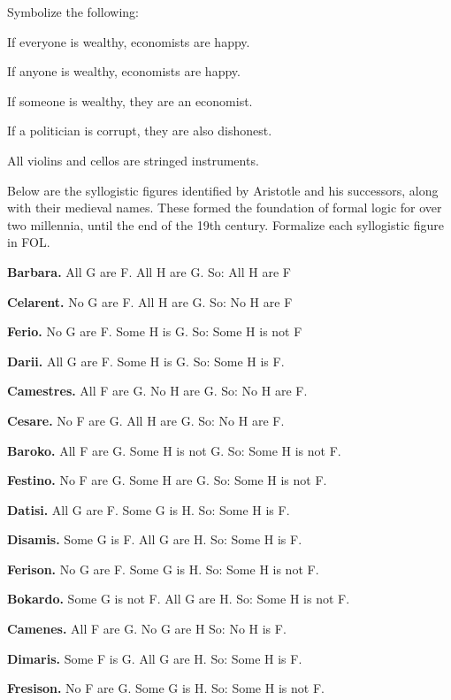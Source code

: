 \practiceproblems
\problempart  Symbolize the following:

\begin{earg}
\item If everyone is wealthy, economists are happy.
\item If anyone is wealthy, economists are happy.
\item If someone is wealthy, they are an economist.
\item If a politician is corrupt, they are also dishonest.
\item All violins and cellos are stringed instruments.  %
\end{earg}

\problempart\label{pr.BarbaraEtc}
Below are the syllogistic figures identified by Aristotle and his successors, along with their medieval names.  These formed the foundation of formal logic for over two millennia, until the end of the 19th century.  Formalize each syllogistic figure in FOL.

\begin{ebullet}
	\item \textbf{Barbara.} All G are F. All H are G. So:  All H are F
	\item \textbf{Celarent.} No G are F. All H are G. So: No H are F
	\item \textbf{Ferio.} No G are F. Some H is G. So: Some H is not F
	\item \textbf{Darii.} All G are F. Some H is G. So: Some H is F.
	\item \textbf{Camestres.} All F are G. No H are G. So: No H are F.
	\item \textbf{Cesare.} No F are G. All H are G. So: No H are F.
	\item \textbf{Baroko.} All F are G. Some H is not G. So: Some H is not F.
	\item \textbf{Festino.} No F are G. Some H are G. So: Some H is not F.
	\item \textbf{Datisi.} All G are F. Some G is H. So: Some H is F.
	\item \textbf{Disamis.} Some G is F. All G are H. So: Some H is F.
	\item \textbf{Ferison.} No G are F. Some G is H. So: Some H is not F.
	\item \textbf{Bokardo.} Some G is not F. All G are H. So:  Some H is not F.
	\item \textbf{Camenes.} All F are G. No G are H So: No H is F.
	\item \textbf{Dimaris.} Some F is G. All G are H. So: Some H is F.
	\item \textbf{Fresison.} No F are G. Some G is H. So: Some H is not F.
\end{ebullet}




